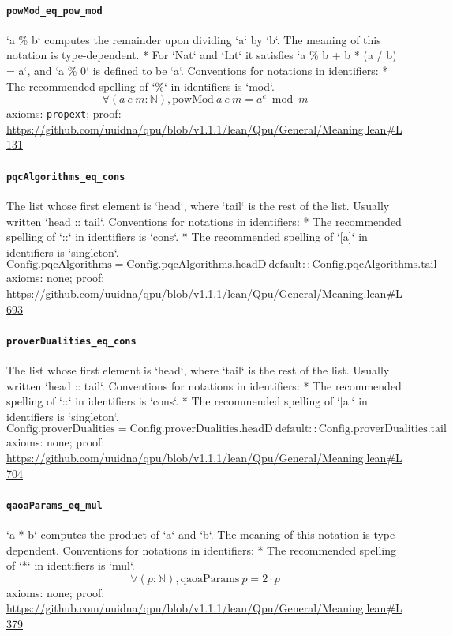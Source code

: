 \documentclass[11pt]{article}
\begin{document}
\paragraph{\texttt{powMod\_eq\_pow\_mod}}
`a \% b` computes the remainder upon dividing `a` by `b`. The meaning of this notation is type-dependent. * For `Nat` and `Int` it satisfies `a \% b + b * (a / b) = a`,   and `a \% 0` is defined to be `a`.   Conventions for notations in identifiers:   * The recommended spelling of `\%` in identifiers is `mod`.
\[ \forall (a\ e\ m : \mathbb{N}), \mathrm{powMod}\ a\ e\ m = a ^{e} \bmod m \]
\noindent axioms: \texttt{propext}; proof: \url{https://github.com/uuidna/qpu/blob/v1.1.1/lean/Qpu/General/Meaning.lean\#L131}

\paragraph{\texttt{pqcAlgorithms\_eq\_cons}}
The list whose first element is `head`, where `tail` is the rest of the list. Usually written `head :: tail`.   Conventions for notations in identifiers:   * The recommended spelling of `::` in identifiers is `cons`.   * The recommended spelling of `[a]` in identifiers is `singleton`.
\[ \mathrm{Config.pqcAlgorithms} = \mathrm{Config.pqcAlgorithms.headD}\ \mathrm{default} :: \mathrm{Config.pqcAlgorithms.tail} \]
\noindent axioms: none; proof: \url{https://github.com/uuidna/qpu/blob/v1.1.1/lean/Qpu/General/Meaning.lean\#L693}

\paragraph{\texttt{proverDualities\_eq\_cons}}
The list whose first element is `head`, where `tail` is the rest of the list. Usually written `head :: tail`.   Conventions for notations in identifiers:   * The recommended spelling of `::` in identifiers is `cons`.   * The recommended spelling of `[a]` in identifiers is `singleton`.
\[ \mathrm{Config.proverDualities} = \mathrm{Config.proverDualities.headD}\ \mathrm{default} :: \mathrm{Config.proverDualities.tail} \]
\noindent axioms: none; proof: \url{https://github.com/uuidna/qpu/blob/v1.1.1/lean/Qpu/General/Meaning.lean\#L704}

\paragraph{\texttt{qaoaParams\_eq\_mul}}
`a * b` computes the product of `a` and `b`. The meaning of this notation is type-dependent.   Conventions for notations in identifiers:   * The recommended spelling of `*` in identifiers is `mul`.
\[ \forall (p : \mathbb{N}), \mathrm{qaoaParams}\ p = 2 \cdot p \]
\noindent axioms: none; proof: \url{https://github.com/uuidna/qpu/blob/v1.1.1/lean/Qpu/General/Meaning.lean\#L379}
\end{document}
